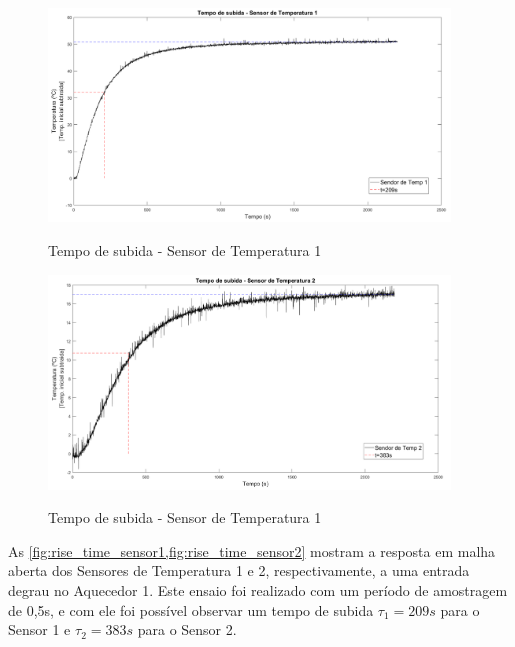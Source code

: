 \begin{figure}[h]
	\caption{Tempo de subida - Sensor de Temperatura 1}
	\begin{center}
		\includegraphics[width=0.95\textwidth]{./5_images/RiseTime-TempSensor1.png} 
		\label{fig:rise_time_sensor1}
	\end{center}
	\centering
\end{figure}

\begin{figure}[h]
	\caption{Tempo de subida - Sensor de Temperatura 1}
	\begin{center}
		\includegraphics[width=0.95\textwidth]{./5_images/RiseTime-TempSensor2.png} 
		\label{fig:rise_time_sensor2}
	\end{center}
	\centering
\end{figure}

As \cref{fig:rise_time_sensor1,fig:rise_time_sensor2} mostram a resposta em malha aberta dos Sensores de
Temperatura 1 e 2, respectivamente, a uma entrada degrau no Aquecedor 1. Este ensaio foi realizado com
um período de amostragem de 0,5s, e com ele foi possível observar um tempo de subida $\tau_1 = 209s$ para
o Sensor 1 e $\tau_2 = 383s$ para o Sensor 2.

